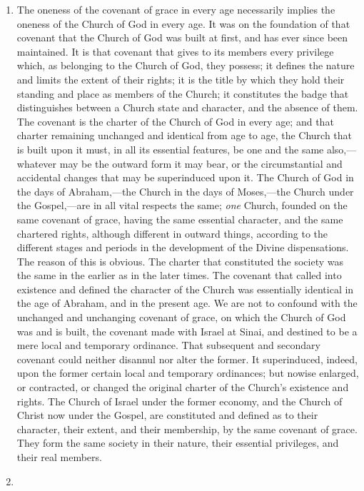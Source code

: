 \documentclass[english,]{book}
\begin{document}
\begin{enumerate}
\def\labelenumi{\arabic{enumi}.}
\item
  The oneness of the covenant of grace in every age necessarily implies the oneness of the Church of God in every age. It was on the foundation of that covenant that the Church of God was built at first, and has ever since been maintained. It is that covenant that gives to its members every privilege which, as belonging to the Church of God, they possess; it defines the nature and limits the extent of their rights; it is the title by which they hold their standing and place as members of the Church; it constitutes the badge that distinguishes between a Church state and character, and the absence of them. The covenant is the charter of the Church of God in every age; and that charter remaining unchanged and identical from age to age, the Church that is built upon it must, in all its essential features, be one and the same also,---whatever may be the outward form it may bear, or the circumstantial and accidental changes that may be superinduced upon it. The Church of God in the days of Abraham,---the Church in the days of Moses,---the Church under the Gospel,---are in all vital respects the same; \emph{one} Church, founded on the same covenant of grace, having the same essential character, and the same chartered rights, although different in outward things, according to the different stages and periods in the development of the Divine dispensations. The reason of this is obvious. The charter that constituted the society was the same in the earlier as in the later times. The covenant that called into existence and defined the character of the Church was essentially identical in the age of Abraham, and in the present age. We are not to confound with the unchanged and unchanging covenant of grace, on which the Church of God was and is built, the covenant made with Israel at Sinai, and destined to be a mere local and temporary ordinance. That subsequent and secondary covenant could neither disannul nor alter the former. It superinduced, indeed, upon the former certain local and temporary ordinances; but nowise enlarged, or contracted, or changed the original charter of the Church's existence and rights. The Church of Israel under the former economy, and the Church of Christ now under the Gospel, are constituted and defined as to their character, their extent, and their membership, by the same covenant of grace. They form the same society in their nature, their essential privileges, and their real members.
\item

\end{enumerate}
\end{document}
